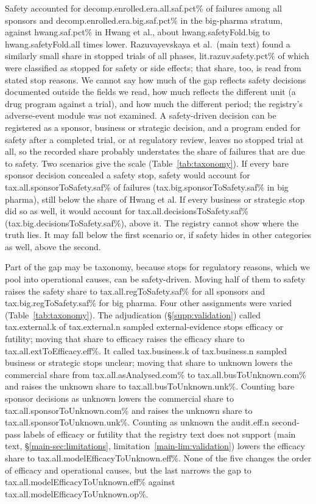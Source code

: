 \documentclass[11pt]{article}
\begin{document}
Safety accounted for \num{decomp.enrolled.era.all.saf.pct}\% of failures among all sponsors and \num{decomp.enrolled.era.big.saf.pct}\% in the big-pharma stratum, against \num{hwang.saf.pct}\% in Hwang et al., about \num{hwang.safetyFold.big} to \num{hwang.safetyFold.all} times lower. Razuvayevskaya et al.\ (main text) found a similarly small share in stopped trials of all phases, \num{lit.razuv.safety.pct}\% of which were classified as stopped for safety or side effects; that share, too, is read from stated stop reasons. We cannot say how much of the gap reflects safety decisions documented outside the fields we read, how much reflects the different unit (a drug program against a trial), and how much the different period; the registry's adverse-event module was not examined. A safety-driven decision can be registered as a sponsor, business or strategic decision, and a program ended for safety after a completed trial, or at regulatory review, leaves no stopped trial at all, so the recorded share probably understates the share of failures that are due to safety. Two scenarios give the scale (Table~\ref{tab:taxonomy}). If every bare sponsor decision concealed a safety stop, safety would account for \num{tax.all.sponsorToSafety.saf}\% of failures (\num{tax.big.sponsorToSafety.saf}\% in big pharma), still below the share of Hwang et al. If every business or strategic stop did so as well, it would account for \num{tax.all.decisionsToSafety.saf}\% (\num{tax.big.decisionsToSafety.saf}\%), above it. The registry cannot show where the truth lies. It may fall below the first scenario or, if safety hides in other categories as well, above the second.

Part of the gap may be taxonomy, because stops for regulatory reasons, which we pool into operational causes, can be safety-driven. Moving half of them to safety raises the safety share to \num{tax.all.regToSafety.saf}\% for all sponsors and \num{tax.big.regToSafety.saf}\% for big pharma. Four other assignments were varied (Table~\ref{tab:taxonomy}). The adjudication (\S\ref{supp:validation}) called \num{tax.external.k} of \num{tax.external.n} sampled external-evidence stops efficacy or futility; moving that share to efficacy raises the efficacy share to \num{tax.all.extToEfficacy.eff}\%. It called \num{tax.business.k} of \num{tax.business.n} sampled business or strategic stops unclear; moving that share to unknown lowers the commercial share from \num{tax.all.asAnalysed.com}\% to \num{tax.all.busToUnknown.com}\% and raises the unknown share to \num{tax.all.busToUnknown.unk}\%. Counting bare sponsor decisions as unknown lowers the commercial share to \num{tax.all.sponsorToUnknown.com}\% and raises the unknown share to \num{tax.all.sponsorToUnknown.unk}\%. Counting as unknown the \num{audit.eff.n} second-pass labels of efficacy or futility that the registry text does not support (main text, \S\ref{main-sec:limitations}, limitation~\ref{main-lim:validation}) lowers the efficacy share to \num{tax.all.modelEfficacyToUnknown.eff}\%. None of the five changes the order of efficacy and operational causes, but the last narrows the gap to \num{tax.all.modelEfficacyToUnknown.eff}\% against \num{tax.all.modelEfficacyToUnknown.op}\%.
\end{document}

